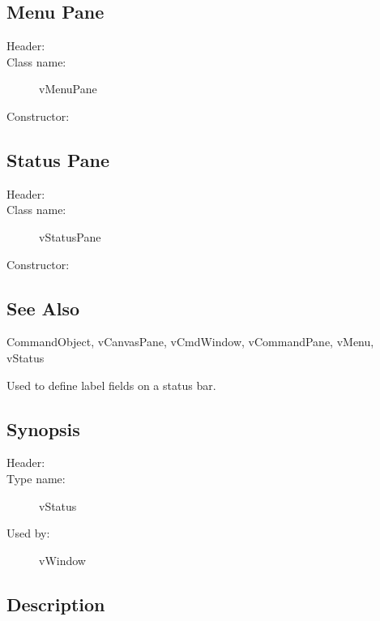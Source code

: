 \subsection* {Menu Pane}
\begin{description}
        \item [Header:] 
        \item [Class name:] vMenuPane
	\item [Constructor:] 
\end{description}

\subsection* {Status Pane}
\begin{description}
        \item [Header:] 
        \item [Class name:] vStatusPane
	\item [Constructor:] 
\end{description}

\subsection* {See Also}

CommandObject, vCanvasPane, vCmdWindow, vCommandPane, vMenu,
vStatus



Used to define label fields on a status bar.

\subsection* {Synopsis}

\begin{description}
	\item [Header:] 
	\item [Type name:] vStatus
	\item [Used by:] vWindow
\end{description}

\subsection* {Description}

